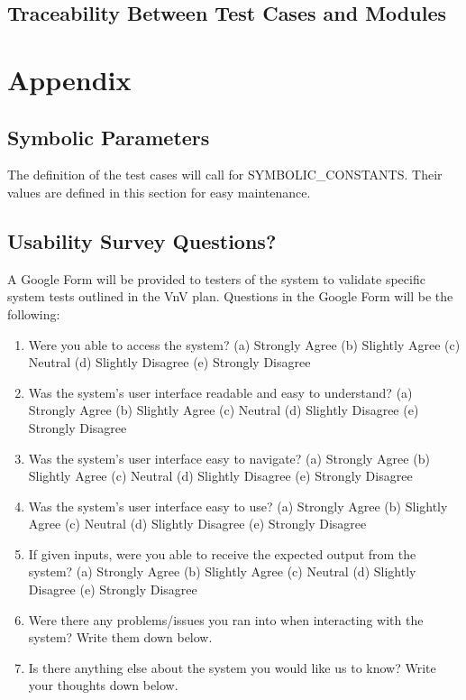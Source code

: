 \documentclass[12pt, titlepage]{article}
\begin{document}
\subsection{Traceability Between Test Cases and Modules}

				




\newpage

\section{Appendix}

\subsection{Symbolic Parameters}

The definition of the test cases will call for SYMBOLIC\_CONSTANTS.
Their values are defined in this section for easy maintenance.

\subsection{Usability Survey Questions?}

A Google Form will be provided to testers of the system to validate specific
system tests outlined in the VnV plan. Questions in the Google Form will be
the following:

\begin{enumerate}
  \item Were you able to access the system?
  \subitem (a) Strongly Agree
  \subitem (b) Slightly Agree
  \subitem (c) Neutral
  \subitem (d) Slightly Disagree
  \subitem (e) Strongly Disagree
  \item Was the system's user interface readable and easy to understand?
  \subitem (a) Strongly Agree
  \subitem (b) Slightly Agree
  \subitem (c) Neutral
  \subitem (d) Slightly Disagree
  \subitem (e) Strongly Disagree
  \item Was the system's user interface easy to navigate?
  \subitem (a) Strongly Agree
  \subitem (b) Slightly Agree
  \subitem (c) Neutral
  \subitem (d) Slightly Disagree
  \subitem (e) Strongly Disagree
  \item Was the system's user interface easy to use?
  \subitem (a) Strongly Agree
  \subitem (b) Slightly Agree
  \subitem (c) Neutral
  \subitem (d) Slightly Disagree
  \subitem (e) Strongly Disagree
  \item If given inputs, were you able to receive the expected output from
  the system?
  \subitem (a) Strongly Agree
  \subitem (b) Slightly Agree
  \subitem (c) Neutral
  \subitem (d) Slightly Disagree
  \subitem (e) Strongly Disagree
  \item Were there any problems/issues you ran into when interacting with
  the system? Write them down below.
  \item Is there anything else about the system you would like us to know?
  Write your thoughts down below.
\end{enumerate}
\end{document}
